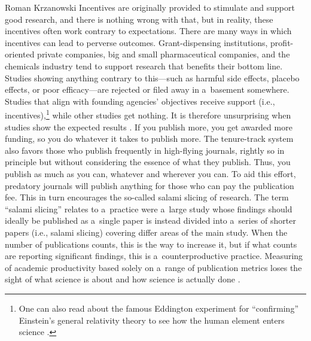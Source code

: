 \begin{newrevengenv}{Roman Krzanowski}
Incentives are originally provided to stimulate and support good research, and there is nothing wrong with that, but in reality, these incentives often work contrary to expectations. There are many ways in which incentives can lead to perverse outcomes. Grant-dispensing institutions, profit-oriented private companies, big and small pharmaceutical companies, and the chemicals industry tend to support research that benefits their bottom line. Studies showing anything contrary to this—such as harmful side effects, placebo effects, or poor efficacy—are rejected or filed away in a~basement somewhere. Studies that align with founding agencies' objectives receive support (i.e., incentives),\footnote{One can also read about the famous Eddington experiment for ``confirming'' Einstein's general relativity theory to see how the human element enters science
\parencite[][]{strevens_knowledge_2022}. %
 } while other studies get nothing. It is therefore unsurprising when studies show the expected results 
\parencite[see also][]{strevens_knowledge_2022}. %
 If you publish more, you get awarded more funding, so you do whatever it takes to publish more. The tenure-track system also favors those who publish frequently in high-flying journals, rightly so in principle but without considering the essence of what they publish. Thus, you publish as much as you can, whatever and wherever you can. To aid this effort, predatory journals will publish anything for those who can pay the publication fee. This in turn encourages the so-called salami slicing of research. The term ``salami slicing'' relates to a~practice were a~large study whose findings should ideally be published as a~single paper is instead divided into a~series of shorter papers (i.e., salami slicing) covering differ areas of the main study. When the number of publications counts, this is the way to increase it, but if what counts are reporting significant findings, this is a~counterproductive practice. Measuring of academic productivity based solely on a~range of publication metrics 
\parencite[see e.g.][]{carpenter_using_2014} %
 loses the sight of what science is about and how science is actually done 
\parencite[][]{}.%



\end{newrevengenv}

